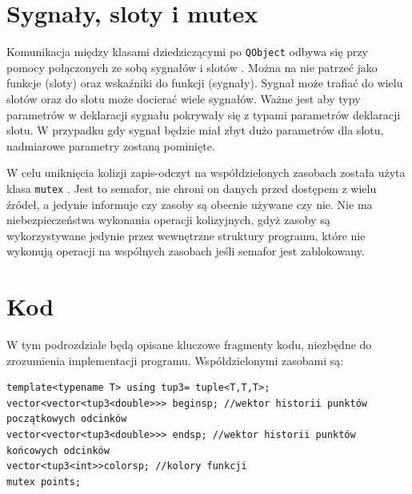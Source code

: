 \section{Sygnały, sloty i mutex}
\label{sec::sig_slot}
Komunikacja między klasami dziedziczącymi po \texttt{QObject} odbywa się przy pomocy połączonych ze sobą sygnałów i slotów \cite{Qt}. Można na nie patrzeć jako funkcje (sloty) oraz wskaźniki do funkcji (sygnały). Sygnał może trafiać do wielu slotów oraz do slotu może docierać wiele sygnałów. Ważne jest aby typy parametrów w deklaracji sygnału pokrywały się z typami parametrów deklaracji slotu. W przypadku gdy sygnał będzie miał zbyt dużo parametrów dla slotu, nadmiarowe parametry zostaną pominięte.

W celu uniknięcia kolizji zapis-odczyt na współdzielonych zasobach została użyta klasa \texttt{mutex} \cite{Crf}. Jest to semafor, nie chroni on danych przed dostępem z wielu źródeł, a jedynie informuje czy zasoby są obecnie używane czy nie. Nie ma niebezpieczeństwa wykonania operacji kolizyjnych, gdyż zasoby są wykorzystywane jedynie przez wewnętrzne struktury programu, które nie wykonują operacji na wspólnych zasobach jeśli semafor jest zablokowany.

\section{Kod}
\label{sec::kod}
W tym podrozdziale będą opisane kluczowe fragmenty kodu, niezbędne do zrozumienia implementacji programu. Współdzielonymi zasobami są:
\begin{lstlisting}
template<typename T> using tup3= tuple<T,T,T>;
vector<vector<tup3<double>>> beginsp; //wektor historii punktów początkowych odcinków
vector<vector<tup3<double>>> endsp; //wektor historii punktów końcowych odcinków
vector<tup3<int>>colorsp; //kolory funkcji
mutex points;
\end{lstlisting}

